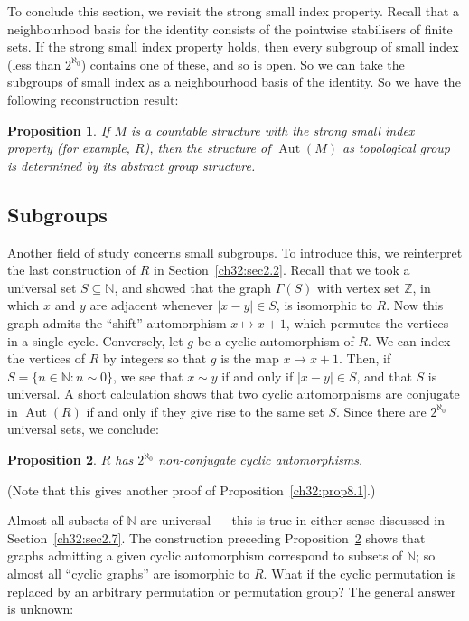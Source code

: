 \documentclass[12pt]{article}
\newtheorem{proposition}{Proposition}
\DeclareMathOperator{\Aut}{Aut}
\begin{document}
To conclude this section, we revisit the strong small index property. Recall
that a neighbourhood basis for the identity consists of the pointwise 
stabilisers of finite sets. If the strong small index property holds, then
every subgroup of small index (less than $2^{\aleph_0}$) contains one of
these, and so is open. So we can take the subgroups of small index as a
neighbourhood basis of the identity. So we have the following reconstruction
result:

\begin{proposition}
\label{ch32:reconst}
If $M$ is a countable structure with the strong small index property (for
example, $R$), then the structure of $\Aut(M)$ as topological group is
determined by its abstract group structure.
\end{proposition}

\subsection{Subgroups}

Another field of study concerns small subgroups. To introduce this,
we reinterpret the last construction of $R$ in
Section~\ref{ch32:sec2.2}. Recall that we took a universal set $S
\subseteq \mathbb{N}$, and showed that the graph $\Gamma(S)$ with
vertex set $\mathbb{Z}$, in which $x$ and $y$ are adjacent whenever
$|x- y|\in S$, is isomorphic to $R$. Now this graph admits the
``shift'' automorphism $x \mapsto  x + 1$, which permutes the
vertices in a single cycle. Conversely, let $g$ be a cyclic
automorphism of $R$. We can index the vertices of $R$ by integers so
that $g$ is the map $x \mapsto  x + 1$. Then, if $S = \{n \in
\mathbb{N}: n \sim 0\}$, we see that $x \sim y$ if and only if $|x-
y|\in S$, and that $S$ is universal. A short calculation shows that
two cyclic automorphisms are conjugate in $\Aut(R)$ if and only
if they give rise to the same set $S$. Since there are
$2^{\aleph_0}$ universal sets, we conclude:

\begin{proposition}\label{ch32:prop8.2} 
$R$ has $2^{\aleph_0}$ non-conjugate cyclic automorphisms.
\end{proposition}

(Note that this gives another proof of Proposition~\ref{ch32:prop8.1}.)

Almost all subsets of $\mathbb{N}$ are universal --- this is true in
either sense discussed in Section~\ref{ch32:sec2.7}. The
construction preceding Proposition~\ref{ch32:prop8.2} shows that
graphs admitting a given cyclic automorphism correspond to subsets
of $\mathbb{N}$; so almost all ``cyclic graphs'' are isomorphic to
$R$. What if the cyclic permutation is replaced by an arbitrary
permutation or permutation group? The general answer is unknown:
\end{document}
